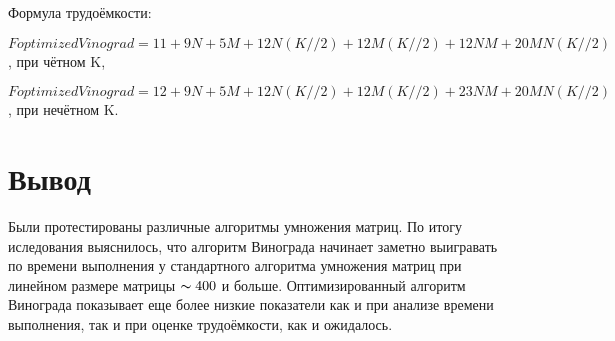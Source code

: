 Формула трудоёмкости:

$FoptimizedVinograd = 11+9N+5M+12N(K//2)+12M(K//2)+12NM+20MN(K//2)$,  при чётном K,

$FoptimizedVinograd = 12+9N+5M+12N(K//2)+12M(K//2)+23NM+20MN(K//2)$,  при нечётном K.

\section{Вывод}
Были протестированы различные алгоритмы умножения матриц. По итогу иследования выяснилось, что алгоритм Винограда начинает заметно выигравать по времени выполнения у стандартного алгоритма умножения матриц при линейном размере матрицы $\thicksim400$ и больше. Оптимизированный алгоритм Винограда показывает еще более низкие показатели как и при анализе времени выполнения, так и при оценке трудоёмкости, как и ожидалось.
